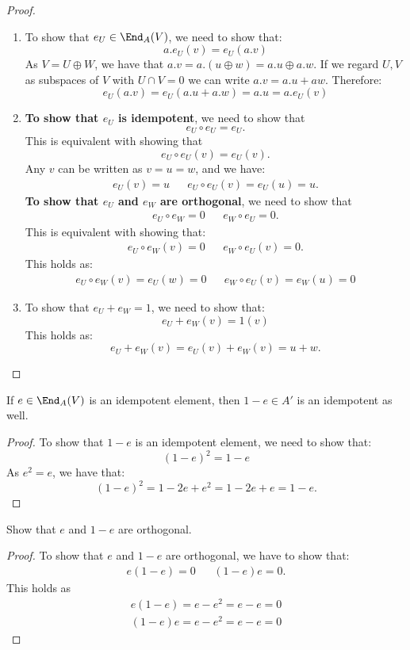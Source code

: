 \begin{proof}

\begin{enumerate}
  \item To show that \(e_U\in \End_A(V)\), we need to show that:
\[
a.e_U(v)=e_U(a.v)
\]
As \(V=U\oplus W\), we have that \(a.v=a.(u\oplus w)=a.u\oplus a.w\). If we regard \(U,V\) as subspaces of \(V\) with \(U\cap V=0\) we can write $a.v=a.u+aw$. Therefore:
\[
e_U(a.v)=e_U(a.u+a.w)=a.u=a.e_U(v)
\]
  \item \textbf{To show that \(e_U\) is idempotent}, we need to show that
\[
e_U \circ e_U=e_U.
\]
This is equivalent with showing that
\[
e_U\circ e_U(v)=e_U(v).
\]
Any \(v\) can be written as \(v=u=w\), and we have:
\begin{align*}
e_U(v)=u &&e_U\circ e_U(v)=e_U(u)=u.
\end{align*}
\textbf{To show that \(e_U\) and \(e_W\) are orthogonal}, we need to show that
\begin{align*}
e_U\circ e_W=0 && e_W\circ e_U=0.
\end{align*}
This is equivalent with showing that:
\begin{align*}
e_U\circ e_W(v)=0 && e_W\circ e_U(v)=0.
\end{align*}
This holds as:
\begin{align*}
e_U\circ e_W(v)=e_U(w)=0 &&e_W\circ e_U(v)=e_W(u)=0 
\end{align*}
  \item To show that \(e_U+e_W=1\), we need to show that:
\[
e_U+e_W(v)=1(v)
\]
This holds as:
\[
e_U+e_W(v)=e_U(v)+e_W(v)=u+w.
\]
\end{enumerate}

\end{proof}

\begin{prop}
If \(e\in \End_A(V)\) is an idempotent element, then \(1-e\in A'\) is an idempotent as well.
\end{prop}

\begin{proof}
To show that \(1-e\) is an idempotent element, we need to show that:
\[
(1-e)^2=1-e
\]
As $e^2=e$, we have that:
\[
(1-e)^2=1-2e+e^2=1-2e+e=1-e.
\]
\end{proof}

\begin{prop}
Show that \(e\) and \(1-e\) are orthogonal.
\end{prop}

\begin{proof}
To show that \(e\) and \(1-e\) are orthogonal, we have to show that:
\begin{align*}
e(1-e)=0 &&(1-e)e=0.
\end{align*}
This holds as
\begin{gather*}
e(1-e)=e-e^2=e-e=0 \\
(1-e)e=e-e^2=e-e=0
\end{gather*}
\end{proof}

